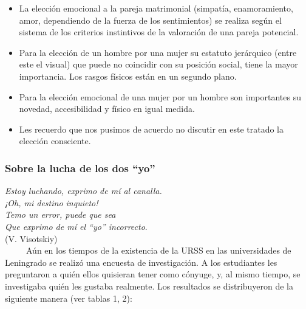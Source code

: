 \begin{itemize}

\item
  La elección emocional a la pareja matrimonial (simpatía,
  enamoramiento, amor, dependiendo de la fuerza de los sentimientos) se
  realiza según el sistema de los criterios instintivos de la valoración
  de una pareja potencial.
\item
  Para la elección de un hombre por una mujer su estatuto jerárquico
  (entre este el visual) que puede no coincidir con su posición social,
  tiene la mayor importancia. Los rasgos físicos están en un segundo
  plano.
\item
  Para la elección emocional de una mujer por un hombre son importantes
  su novedad, accesibilidad y físico en igual medida.
\item
  Les recuerdo que nos pusimos de acuerdo no discutir en este tratado la
  elección consciente.
\end{itemize}

\protect\hypertarget{M11}{}{}

\subsubsection{Sobre la lucha de los dos ``yo''}

\noindent
\textit{Estoy luchando, exprimo de mí al canalla.}\\
\textit{¡Oh, mi destino inquieto!}\\
\textit{Temo un error, puede que sea}\\
\textit{Que exprimo de mí el ``yo'' incorrecto}.\\
(V. Visotskiy)\\



~ ~ ~ Aún en los tiempos de la existencia de la URSS en las
universidades de Leningrado se realizó una encuesta de investigación. A
los estudiantes les preguntaron a quién ellos quisieran tener como
cónyuge, y, al mismo tiempo, se investigaba quién les gustaba realmente.
Los resultados se distribuyeron de la siguiente manera (ver tablas 1,
2):




